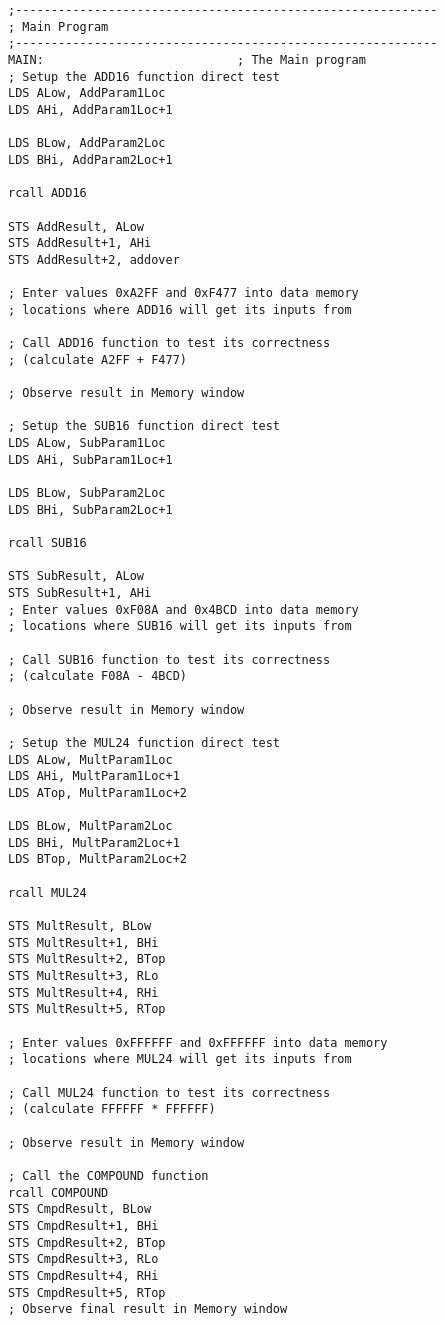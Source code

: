 \documentclass[12pt,letterpaper]{article}
\begin{document}
\begin{verbatim}
;-----------------------------------------------------------
; Main Program
;-----------------------------------------------------------
MAIN:							; The Main program
; Setup the ADD16 function direct test
LDS ALow, AddParam1Loc
LDS AHi, AddParam1Loc+1

LDS BLow, AddParam2Loc
LDS BHi, AddParam2Loc+1

rcall ADD16

STS AddResult, ALow
STS AddResult+1, AHi
STS AddResult+2, addover

; Enter values 0xA2FF and 0xF477 into data memory
; locations where ADD16 will get its inputs from

; Call ADD16 function to test its correctness
; (calculate A2FF + F477)

; Observe result in Memory window

; Setup the SUB16 function direct test
LDS ALow, SubParam1Loc
LDS AHi, SubParam1Loc+1

LDS BLow, SubParam2Loc
LDS BHi, SubParam2Loc+1

rcall SUB16

STS SubResult, ALow
STS SubResult+1, AHi
; Enter values 0xF08A and 0x4BCD into data memory
; locations where SUB16 will get its inputs from

; Call SUB16 function to test its correctness
; (calculate F08A - 4BCD)

; Observe result in Memory window

; Setup the MUL24 function direct test
LDS ALow, MultParam1Loc
LDS AHi, MultParam1Loc+1
LDS ATop, MultParam1Loc+2

LDS BLow, MultParam2Loc
LDS BHi, MultParam2Loc+1
LDS BTop, MultParam2Loc+2

rcall MUL24

STS MultResult, BLow
STS MultResult+1, BHi
STS MultResult+2, BTop
STS MultResult+3, RLo
STS MultResult+4, RHi
STS MultResult+5, RTop

; Enter values 0xFFFFFF and 0xFFFFFF into data memory
; locations where MUL24 will get its inputs from

; Call MUL24 function to test its correctness
; (calculate FFFFFF * FFFFFF)

; Observe result in Memory window

; Call the COMPOUND function
rcall COMPOUND
STS CmpdResult, BLow
STS CmpdResult+1, BHi
STS CmpdResult+2, BTop
STS CmpdResult+3, RLo
STS CmpdResult+4, RHi
STS CmpdResult+5, RTop
; Observe final result in Memory window


\end{verbatim}
\end{document}
